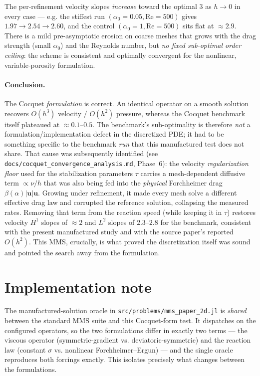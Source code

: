 \documentclass[11pt]{article}
\newcommand{\uu}{\bm{u}}
\begin{document}
The per-refinement velocity slopes \emph{increase} toward the optimal $3$ as
$h\to0$ in every case --- e.g. the stiffest run $(\alpha_0=0.05,\mathrm{Re}=500)$
gives $1.97\to2.54\to2.60$, and the control $(\alpha_0=1,\mathrm{Re}=500)$ sits
flat at $\approx 2.9$. There is a mild pre-asymptotic erosion on coarse meshes
that grows with the drag strength (small $\alpha_0$) and the Reynolds number,
but \emph{no fixed sub-optimal order ceiling}: the scheme is consistent and
optimally convergent for the nonlinear, variable-porosity formulation.

\paragraph{Conclusion.}
The Cocquet \emph{formulation} is correct. An identical operator on a smooth
solution recovers $O(h^3)$ velocity / $O(h^2)$ pressure, whereas the Cocquet
benchmark itself plateaued at $\approx0.1$--$0.5$. The benchmark's
sub-optimality is therefore \emph{not} a formulation/implementation defect in
the discretized PDE; it had to be something specific to the benchmark
\emph{run} that this manufactured test does not share. That cause was
subsequently identified (see \texttt{docs/cocquet\_convergence\_analysis.md},
Phase~6): the velocity \emph{regularization floor} used for the stabilization
parameters $\tau$ carries a mesh-dependent diffusive term
$\propto \nu/h$ that was also being fed into the \emph{physical} Forchheimer
drag $\beta(\alpha)\lvert\uu\rvert\uu$. Growing under refinement, it made every
mesh solve a different effective drag law and corrupted the reference solution,
collapsing the measured rates. Removing that term from the reaction speed
(while keeping it in $\tau$) restores velocity $H^1$ slopes of $\approx 2$ and
$L^2$ slopes of $2.3$--$2.8$ for the benchmark, consistent with the present
manufactured study and with the source paper's reported $O(h^2)$. This MMS,
crucially, is what proved the discretization itself was sound and pointed the
search away from the formulation.

\section*{Implementation note}
The manufactured-solution oracle in \texttt{src/problems/mms\_paper\_2d.jl} is
\emph{shared} between the standard MMS suite and this Cocquet-form test. It
dispatches on the configured operators, so the two formulations differ in
exactly two terms --- the viscous operator (symmetric-gradient vs.
deviatoric-symmetric) and the reaction law (constant $\sigma$ vs. nonlinear
Forchheimer--Ergun) --- and the single oracle reproduces both forcings exactly.
This isolates precisely what changes between the formulations.
\end{document}
